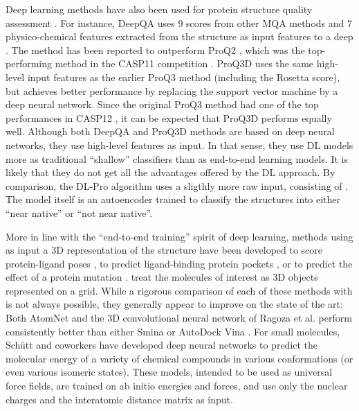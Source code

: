Deep learning methods have also been used for protein structure
quality assessment \cite{nguyen2014dlpro, cao2016deepqa,
uziela2017proq3d}. For instance, DeepQA \cite{cao2016deepqa} uses 9
scores from other MQA methods and 7 physico-chemical features
extracted from the structure as input features to a deep . The method has been reported \cite{cao2016deepqa} to
outperform ProQ2 \cite{ray2012proq2}, which was the top-performing
method in the CASP11 competition \cite{kryshtafovych2015}.
ProQ3D \cite{uziela2017proq3d} uses the same high-level input features
as the earlier ProQ3 method \cite{uziela2016proq3} (including the
Rosetta \cite{leaverfay2011rosetta} score), but achieves better
performance by replacing the support vector machine by a deep neural
network. Since the original ProQ3 method had one of the top
performances in CASP12 \cite{elofsson2017qacasp12}, it can be expected
that ProQ3D performs equally well. Although both DeepQA and ProQ3D
methods are based on deep neural networks, they use high-level
features as input. In that sense, they use DL models more as
traditional ``shallow'' classifiers than as end-to-end learning
models. It is likely that they do not get all the advantages offered
by the DL approach.
%
By comparison, the DL-Pro algorithm \cite{nguyen2014dlpro} uses a
sligthly more raw input, consisting of . The model itself is an autoencoder  trained to classify
the structures into either ``near native'' or ``not near native''.

More in line with the ``end-to-end training'' spirit of deep learning,
methods using as input a 3D representation of the structure have been
developed to score protein-ligand poses \cite{wallach2015atomnet,
ragoza2017ligandscoring}, to predict ligand-binding protein
pockets \cite{jimenez2017deepsite}, or to predict the effect of a
protein mutation \cite{torng2017}.  treat the molecules of interest as 3D
objects represented on a grid. While a rigorous comparison of each of
these methods with is not always possible, they generally appear to
improve on the state of the art: Both
AtomNet \cite{wallach2015atomnet} and the 3D convolutional neural
network of Ragoza et al. \cite{ragoza2017ligandscoring} perform
consistently better than either Smina \cite{koes2013smina} or AutoDock
Vina \cite{trott2009vina}.
%
For small molecules, Sch\"{u}tt and coworkers \cite{schutt2017nc,
schutt2017moleculenet} have developed deep neural networks to predict
the molecular energy of a variety of chemical compounds in various
conformations (or even various isomeric states). These models,
intended to be used as universal force fields, are trained on ab
initio energies and forces, and use only the nuclear charges and the
interatomic distance matrix as input.

